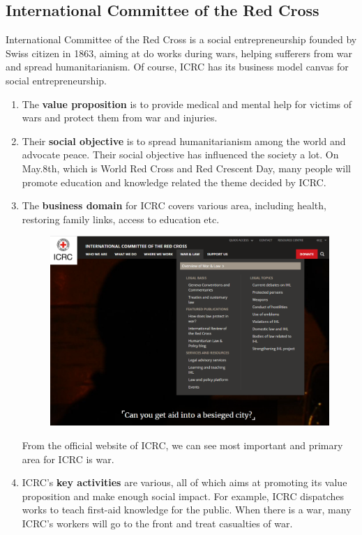 \documentclass[12pt]{article}
\begin{document}
\subsection{International Committee of the Red Cross}
International Committee of the Red Cross is a social entrepreneurship founded by Swiss citizen in 1863, aiming at do works during wars, helping sufferers from war and spread humanitarianism. Of course, ICRC has its business model canvas for social entrepreneurship.
\begin{enumerate}[-]
\item The \textbf{value proposition} is to provide medical and mental help for victims of wars and protect them from war and injuries.
\item Their \textbf{social objective} is to spread humanitarianism among the world and advocate peace. Their social objective has influenced the society a lot. On May.8th, which is World Red Cross and Red Crescent Day, many people will promote education and knowledge related the theme decided by ICRC.
\item The \textbf{business domain} for ICRC covers various area, including health, restoring family links, access to education etc. 
\begin{figure}[H]
\centering
\includegraphics[scale=0.25]{P3.png}
\end{figure}
From the official website of ICRC, we can see most important and primary area for ICRC is war.
\item
ICRC's \textbf{key activities} are various, all of which aims at promoting its value proposition and make enough social impact. For example, ICRC dispatches works to teach first-aid knowledge for the public. When there is a war, many ICRC's workers will go to the front and treat casualties of war.

\end{enumerate}
\end{document}
